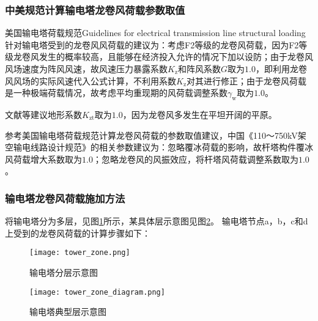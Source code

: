 \subsubsection{中美规范计算输电塔龙卷风荷载参数取值}
美国输电塔荷载规范Guidelines for electrical transmission line structural loading\cite{wong2009guidelines}针对输电塔受到的龙卷风风荷载的建议为：考虑F2等级的龙卷风荷载，因为F2等级龙卷风发生的概率较高，且能够在经济投入允许的情况下加以设防；由于龙卷风风场速度为阵风风速，故风速压力暴露系数$K_\mathrm{z}$和阵风系数$G$取为$1.0$，即利用龙卷风风场的实际风速代入公式计算，不利用系数$K_\mathrm{z}$对其进行修正；由于龙卷风荷载是一种极端荷载情况，故考虑平均重现期的风荷载调整系数$\gamma_\mathrm{w}$取为$1.0$。

文献\cite{hamada2010finite}\cite{hamada2011behaviour}\cite{altalmas2014finite}等建议地形系数$K_\mathrm{zt}$取为$1.0$，因为龙卷风多发生在平坦开阔的平原。


参考美国输电塔荷载规范计算龙卷风荷载的参数取值建议，中国《110～750kV架空输电线路设计规范》的相关参数建议为：忽略覆冰荷载的影响，故杆塔构件覆冰风荷载增大系数取为$1.0$；忽略龙卷风的风振效应，将杆塔风荷载调整系数取为$1.0$。

\subsubsection{输电塔龙卷风荷载施加方法}
将输电塔分为多层，见图\ref{fig:tower-zone}所示，某具体层示意图见图\ref{fig:tower-zone-diagram}。
输电塔节点a，b，c和d上受到的龙卷风荷载的计算步骤如下：
\begin{figure}[!htbp]
	\centering
	\texttt{[image: tower\_zone.png]}
	\caption{输电塔分层示意图}\label{fig:tower-zone}
\end{figure}

\begin{figure}[!htbp]
	\centering
	\texttt{[image: tower\_zone\_diagram.png]}
	\caption{输电塔典型层示意图}\label{fig:tower-zone-diagram}
\end{figure}


